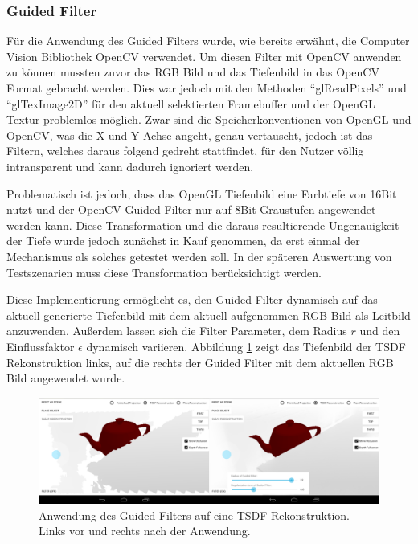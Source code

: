 \subsubsection*{Guided Filter}

Für die Anwendung des Guided Filters wurde, wie bereits erwähnt, die Computer Vision Bibliothek OpenCV verwendet. Um diesen Filter mit OpenCV anwenden zu können mussten zuvor das RGB Bild und das Tiefenbild in das OpenCV Format gebracht werden. Dies war jedoch mit den Methoden \enquote{glReadPixels} und \enquote{glTexImage2D} für den aktuell selektierten Framebuffer und der OpenGL Textur problemlos möglich. Zwar sind die Speicherkonventionen von OpenGL und OpenCV, was die X und Y Achse angeht, genau vertauscht, jedoch ist das Filtern, welches daraus folgend gedreht stattfindet, für den Nutzer völlig intransparent und kann dadurch ignoriert werden.

Problematisch ist jedoch, dass das OpenGL Tiefenbild eine Farbtiefe von 16Bit nutzt und der OpenCV Guided Filter nur auf 8Bit Graustufen angewendet werden kann. Diese Transformation und die daraus resultierende Ungenauigkeit der Tiefe wurde jedoch zunächst in Kauf genommen, da erst einmal der Mechanismus als solches getestet werden soll. In der späteren Auswertung von Testszenarien muss diese Transformation berücksichtigt werden. 

Diese Implementierung ermöglicht es, den Guided Filter dynamisch auf das aktuell generierte Tiefenbild mit dem aktuell aufgenommen RGB Bild als Leitbild anzuwenden. Außerdem lassen sich die Filter Parameter, dem Radius \(r\) und den Einflussfaktor \(\epsilon\) dynamisch variieren. Abbildung \ref{fig:filter-demo} zeigt das Tiefenbild der TSDF Rekonstruktion links, auf die rechts der Guided Filter mit dem aktuellen RGB Bild angewendet wurde. 

\begin{figure}[h]
  \centering
	\includegraphics[width=1.0\textwidth]{content/images/implementation/filter-demo.png} 
  \caption{Anwendung des Guided Filters auf eine TSDF Rekonstruktion. Links vor und rechts nach der Anwendung.}
  \label{fig:filter-demo}
\end{figure}
